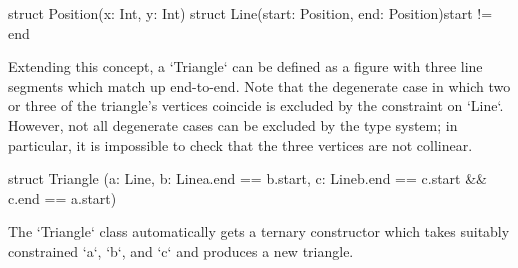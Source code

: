 \begin{xten}
struct Position(x: Int, y: Int) {}
struct Line(start: Position, end: Position){start != end}
  {}
\end{xten}


Extending this concept, a \xcd`Triangle` can be defined as a figure with three
line segments which match up end-to-end.  Note that the degenerate case in
which two or three of the triangle's vertices coincide is excluded by the
constraint on \xcd`Line`.  However, not all degenerate cases can be excluded
by the type system; in particular, it is impossible to check that the three
vertices are not collinear. 

% 
\begin{xten}
struct Triangle 
 (a: Line, 
  b: Line{a.end == b.start}, 
  c: Line{b.end == c.start && c.end == a.start})  
 {}
\end{xten}
%

The \xcd`Triangle` class automatically gets a ternary constructor which takes
suitably constrained \xcd`a`, \xcd`b`, and \xcd`c` and produces a new
triangle. 




